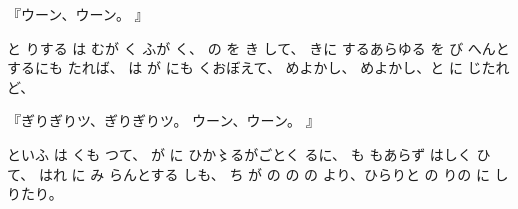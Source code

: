 『ウーン、ウーン。
』

と
りする
は
むが
く
ふが
く、
の
を
き
して、
きに
するあらゆる
を
び
へんとするにも
たれば、
は
が
にも
くおぼえて、
めよかし、
めよかし、と
に
じたれど、

『ぎりぎりツ、ぎりぎりツ。
ウーン、ウーン。
』

といふ
は
くも
つて、
が
に
ひか〻るがごとく
るに、
も
もあらず
はしく
ひて、
はれ
に
み
らんとする
しも、
ち
が
の
の
の
より、ひらりと
の
りの
に
し
りたり。
